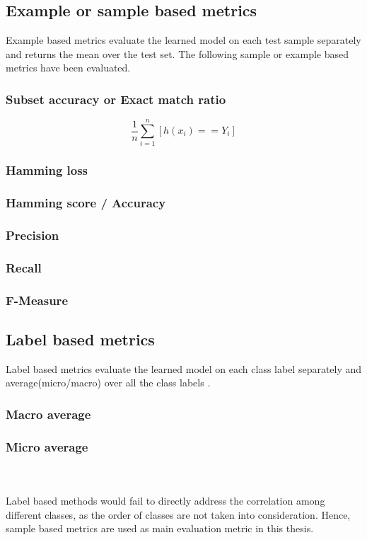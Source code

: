 \subsection{Example or sample based metrics}
Example based metrics evaluate the learned model on each test sample separately and returns the mean over the test set\cite{zhang2013review}. The following sample or example based metrics have been evaluated.

\subsubsection{Subset accuracy or Exact match ratio}

 $$\frac{1}{n}\sum_{i =1}^{n}[h(x_i) == Y_i]$$
 
\subsubsection{Hamming loss}
\subsubsection{Hamming score / Accuracy}
\subsubsection{Precision}
\subsubsection{Recall}
\subsubsection{F-Measure}

\subsection{Label based metrics}
Label based metrics evaluate the learned model on each class label separately and average(micro/macro) over all the class labels \cite{zhang2013review}. 
    
\subsubsection{Macro average}

\subsubsection{Micro average}

\\
\\
Label based methods would fail to directly address the correlation among different classes, as the order of classes are not taken into consideration\cite{zhang2010multi}. Hence, sample based metrics are used as main evaluation metric in this thesis.